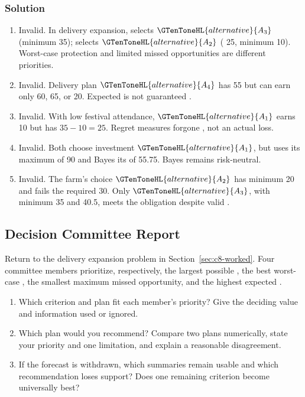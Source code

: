 \subsubsection*{Solution}
\begin{enumerate}
\item Invalid. In delivery expansion,  selects $\GTenToneHL{alternative}{A_3}$ (minimum 35);   selects $\GTenToneHL{alternative}{A_2}$ (  25, minimum 10). Worst-case protection and limited missed opportunities are different priorities.
\item Invalid. Delivery plan $\GTenToneHL{alternative}{A_4}$ has  55 but can earn only 60, 65, or 20. Expected  is not guaranteed .
\item Invalid. With low festival attendance, $\GTenToneHL{alternative}{A_1}$ earns 10 but has  $35-10=25$. Regret measures forgone , not an actual loss.
\item Invalid. Both choose investment $\GTenToneHL{alternative}{A_1}$, but  uses its maximum of 90 and Bayes its  of 55.75. Bayes remains risk-neutral.
\item Invalid. The farm's  choice $\GTenToneHL{alternative}{A_2}$ has minimum 20 and fails the required 30. Only $\GTenToneHL{alternative}{A_3}$, with minimum 35 and  40.5, meets the obligation despite valid .
\end{enumerate}

\subsection{Decision Committee Report}\label{sec:c8-report}
Return to the delivery expansion problem in Section~\ref{sec:c8-worked}. Four committee members prioritize, respectively, the largest possible , the best worst-case , the smallest maximum missed opportunity, and the highest expected .
\begin{enumerate}
\item Which criterion and plan fit each member's priority? Give the deciding value and information used or ignored.
\item Which plan would you recommend? Compare two plans numerically, state your priority and one limitation, and explain a reasonable disagreement.
\item If the forecast is withdrawn, which summaries remain usable and which recommendation loses support? Does one remaining criterion become universally best?
\end{enumerate}
